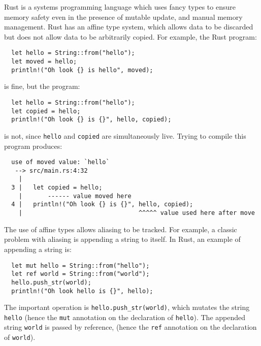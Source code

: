Rust is a systems programming language which uses fancy types to
ensure memory safety even in the presence of mutable update, and
manual memory management. Rust has an affine type system, which
allows data to be discarded but does not allow data to be arbitrarily
copied. For example, the Rust program:
\begin{verbatim}
  let hello = String::from("hello");
  let moved = hello;
  println!("Oh look {} is hello", moved);
\end{verbatim}
is fine, but the program:
\begin{verbatim}
  let hello = String::from("hello");
  let copied = hello;
  println!("Oh look {} is {}", hello, copied);
\end{verbatim}
is not, since \verb|hello| and \verb|copied| are simultaneously live. Trying to compile
this program produces:
\begin{verbatim}
  use of moved value: `hello`
   --> src/main.rs:4:32
    |
  3 |   let copied = hello;
    |       ------ value moved here
  4 |   println!("Oh look {} is {}", hello, copied);
    |                                ^^^^^ value used here after move
\end{verbatim}
The use of affine types allows aliasing to be tracked. For example, a
classic problem with aliasing is appending a string to itself. In
Rust, an example of appending a string is:
\begin{verbatim}
  let mut hello = String::from("hello");
  let ref world = String::from("world");
  hello.push_str(world);
  println!("Oh look hello is {}", hello);
\end{verbatim}
The important operation is \verb|hello.push_str(world)|, which mutates the
string \verb|hello| (hence the \verb|mut| annotation on the declaration of \verb|hello|).
The appended string \verb|world| is passed by reference,
(hence the \verb|ref| annotation on the declaration of \verb|world|).

